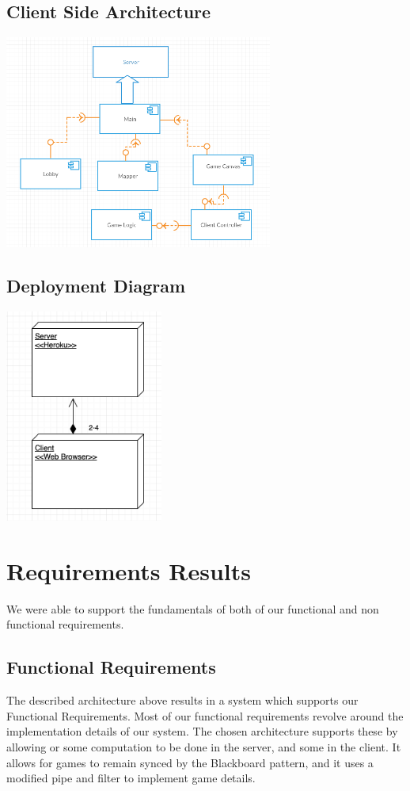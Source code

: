 \documentclass[12pt]{report}
\begin{document}
\subsection{Client Side Architecture}
\includegraphics[width=\linewidth,height=7cm]{images/ClientArchitecture.png}

\subsection{Deployment Diagram}
\includegraphics[height=7cm]{images/deploy_diagram.png}

\section{Requirements Results}
We were able to support the fundamentals of both of our functional and non functional requirements. 
\subsection{Functional Requirements}
The described architecture above results in a system which supports our Functional Requirements. Most of our functional requirements revolve around the implementation details of our system. The chosen architecture supports these by allowing or some computation to be done in the server, and some in the client. It allows for games to remain synced by the Blackboard pattern, and it uses a modified pipe and filter to implement game details.  
\end{document}

